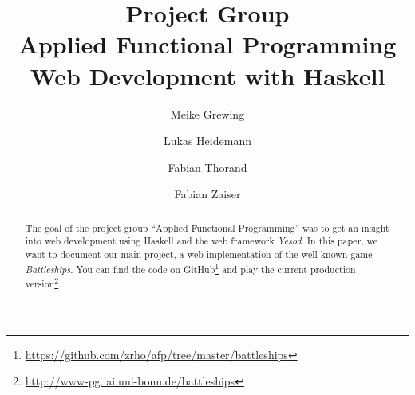 \documentclass[a4paper]{easychair}
\begin{document}
%
\title{Project Group\\ Applied Functional Programming\\
       \large{Web Development with Haskell}}



%
\author{
  Meike Grewing
\and
  Lukas Heidemann
\and
  Fabian Thorand
\and 
  Fabian Zaiser\\
}




\clearpage

\maketitle

\begin{abstract}
The goal of the project group ``Applied Functional Programming'' was to get an insight into web development using Haskell and the web framework \emph{Yesod}. 
In this paper, we want to document our main project, a web implementation of the well-known game \emph{Battleships}. You can find the code on GitHub\footnote{\url{https://github.com/zrho/afp/tree/master/battleships}} and play the current production version\footnote{\url{http://www-pg.iai.uni-bonn.de/battleships}}.
\end{abstract}

\setcounter{tocdepth}{2}

\pagestyle{empty}
\end{document}
